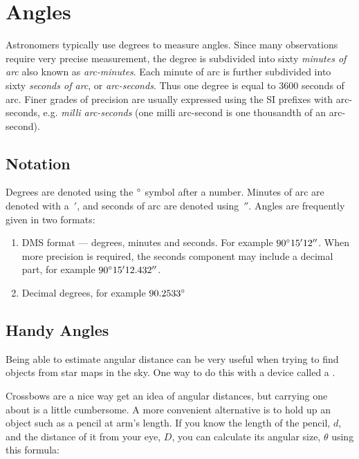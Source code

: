 \section{Angles}
\label{sec:Concepts:Angles}

Astronomers typically use degrees to measure angles. Since many
observations require very precise measurement, the degree is subdivided
into sixty \emph{minutes of arc} also known as \emph{arc-minutes}. Each
minute of arc is further subdivided into sixty \emph{seconds of arc}, or
\emph{arc-seconds}. Thus one degree is equal to 3600 seconds of arc.
Finer grades of precision are usually expressed using the SI prefixes
with arc-seconds, e.g. \emph{milli arc-seconds} (one milli arc-second is
one thousandth of an arc-second).

\subsection{Notation}

Degrees are denoted using the $\degree$ symbol after a number. Minutes of arc are denoted with a~$'$, and seconds of arc are denoted using~$''$. Angles are frequently given in two formats:

\begin{enumerate}
\item
  DMS format --- degrees, minutes and seconds. For example $90\degree15'12''$.
  When more precision is required, the seconds component may include a
  decimal part, for example $90\degree15'12.432''$.
\item
  Decimal degrees, for example $90.2533\degree$
\end{enumerate}

\subsection{Handy Angles}
\label{sec:Concepts:Angles:HandyAngles}

Being able to estimate angular distance can be very useful when trying
to find objects from star maps in the sky. One way to do this with a
device called a .


Crossbows are a nice way get an idea of angular distances, but carrying
one about is a little cumbersome. A more convenient alternative is to
hold up an object such as a pencil at arm's length. If you know the
length of the pencil, $d$, and the distance of it from your eye, $D$, you
can calculate its angular size, $\theta$ using this formula:

